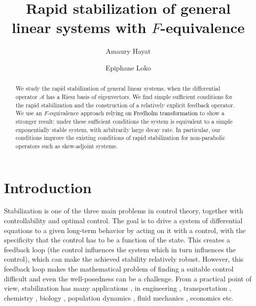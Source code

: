 \documentclass[11pt, dvipsnames]{amsart}
\title{
Rapid stabilization of general linear systems with 
$F$-equivalence
}
\author[A.~Hayat]{Amaury Hayat}
\author[E.~Loko]{Epiphane Loko}
\date{}
\begin{document}
\maketitle

\begin{abstract}
We study the rapid stabilization of general linear systems, when the differential operator $\mathcal{A}$ has a Riesz basis of eigenvectors.
We find simple sufficient conditions for the rapid stabilization and the construction of a relatively explicit feedback operator. We use an $F$-equivalence 
approach \textcolor{black}{relying on Fredholm transformation}
to show a stronger result:
under these sufficient conditions 
the system is equivalent to a simple exponentially stable system, with arbitrarily large decay rate. In 
particular, our conditions improve the existing conditions of rapid stabilization for non-parabolic operators such as skew-adjoint systems. 

\end{abstract}

\section{Introduction}

Stabilization is one of the three main problems in control theory, together with controllability and optimal control. The goal is to drive a system of differential equations to a given long-term behavior by acting on it with a control, with the specificity that the control has to be a function of the state. This creates a feedback loop (the control influences the system which in turn influences the control), which can make the achieved stability relatively robust. However, this feedback loop makes the mathematical problem of finding a suitable control difficult and even the well-posedness can be a challenge.
From a practical point of view, stabilization has many applications \cite{BastinCoronBook}, in engineering \cite{astrom1995pid}, transportation \cite{delle2019feedback,hayat2023dissipation,Goatin_stabilization_2024}, chemistry \cite{viel1997global}, biology \cite{pouchol2018global}, population dynamics \cite{caponigro2013sparse}, fluid mechanics \cite{BastinCoronBook,HS}, economics \cite{kellett2019feedback} etc.
\end{document}
